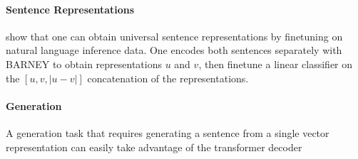 \paragraph{Sentence Representations} 
\citet{conneau2017supervised} show that one can obtain universal sentence representations by finetuning on natural language inference data. One encodes both sentences separately with BARNEY to obtain representations $u$ and $v$, then finetune a linear classifier on the $[u, v, |u-v|]$ concatenation of the representations.


\paragraph{Generation}
A generation task that requires generating a sentence from a single vector representation can easily take advantage of the transformer decoder





